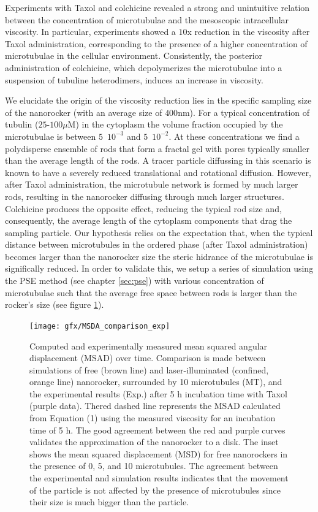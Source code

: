 \documentclass[ twoside,openright,titlepage,numbers=noenddot,%
headinclude,footinclude,cleardoublepage=empty,abstract=on,
BCOR=5mm,paper=a4,fontsize=11pt, dvipsnames
]{scrreprt}
\begin{document}
Experiments with Taxol and colchicine revealed a strong and unintuitive relation between the concentration of microtubulae and the mesoscopic intracellular viscosity. In particular, experiments showed a $10$x reduction in the viscosity after Taxol administration, corresponding to the presence of a higher concentration of microtubulae in the cellular environment. Consistently, the posterior administration of colchicine, which depolymerizes the microtubulae into a suspension of tubuline heterodimers, induces an increase in viscosity.

We elucidate the origin of the viscosity reduction lies in the specific sampling size of the nanorocker (with an average size of $400$nm). For a typical concentration of tubulin ($25$-$100\mu$M) in the cytoplasm the volume fraction occupied by the microtubulae is between $5$~$10^{-3}$ and $5$~$10^{-2}$. At these concentrations we find a polydisperse ensemble of rods that form a fractal gel with pores typically smaller than the average length of the rods. A tracer particle diffussing in this scenario is known to have a severely reduced translational and rotational diffusion\cite{Solomon2010,Alcazar2018}. However, after Taxol administration, the microtubule network is formed by much larger rods, resulting in the nanorocker diffusing through much larger structures. Colchicine produces the opposite effect, reducing the typical rod size and, consequently, the average length of the cytoplasm components that drag the sampling particle. Our hypothesis relies on the expectation that, when the typical distance between microtubules in the ordered phase (after Taxol administration) becomes larger than the nanorocker size the steric hidrance of the microtubulae is significally reduced. In order to validate this, we setup a series of simulation using the \gls{PSE} method (see chapter \ref{sec:pse}) with various concentration of microtubulae such that the average free space between rods is larger than the rocker's size (see figure \ref{fig:msad}).
\begin{figure}[H]
  \label{fig:msad}
  \centering
  \texttt{[image: gfx/MSDA\_comparison\_exp]}
  \caption{Computed and experimentally measured mean squared angular displacement (MSAD) over time. Comparison is made between simulations of free (brown line) and laser-illuminated (confined, orange line) nanorocker, surrounded by 10 microtubules (MT), and the experimental results (Exp.) after 5 h incubation time with Taxol (purple data). Thered dashed line represents the MSAD calculated from Equation (1) using the measured viscosity for an incubation time of 5 h. The good agreement between the red and purple curves validates the approximation of the nanorocker to a disk. The inset shows the mean squared displacement (MSD) for free nanorockers in the presence of 0, 5, and 10 microtubules. The agreement between the experimental and simulation results indicates that the movement of the particle is not affected by the presence of microtubules since their size is much bigger than the particle.}
\end{figure}
\end{document}
